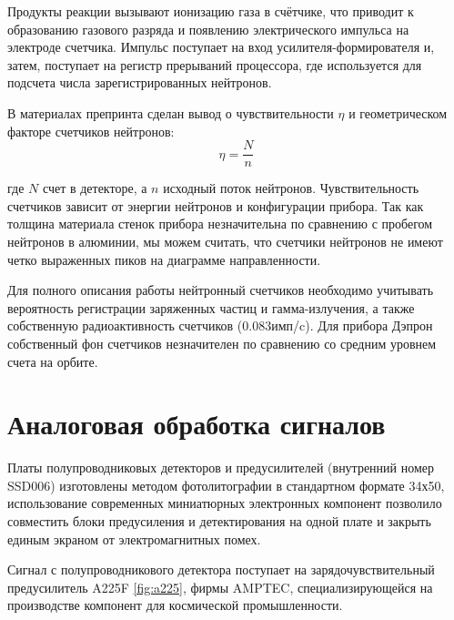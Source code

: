 Продукты реакции вызывают ионизацию газа в счётчике, что приводит к образованию газового разряда и появлению электрического импульса на электроде счетчика. Импульс поступает на вход усилителя-формирователя и, затем, поступает на регистр прерываний процессора, где используется для подсчета числа зарегистрированных нейтронов.
\cite{Shavrin2002}

В материалах препринта \cite{Shavrin1990} сделан вывод о чувствительности $ \eta $ и геометрическом факторе счетчиков нейтронов: 
\begin{equation}\label{eq:sens}
 \eta = \frac{N}{n} 
\end{equation}

где $ N $ счет в детекторе, а $ n $ исходный поток нейтронов. Чувствительность счетчиков зависит от энергии нейтронов и конфигурации прибора. Так как толщина материала стенок прибора незначительна по сравнению с пробегом нейтронов в алюминии, мы можем считать, что счетчики нейтронов не имеют четко выраженных пиков на диаграмме направленности.

Для полного описания работы нейтронный счетчиков необходимо учитывать вероятность регистрации заряженных частиц и гамма-излучения, а также собственную радиоактивность счетчиков (0.083имп/c). Для прибора Дэпрон собственный фон счетчиков незначителен по сравнению со средним уровнем счета на орбите. 

\section{Аналоговая обработка сигналов}

Платы полупроводниковых детекторов и предусилителей (внутренний номер SSD006) изготовлены методом фотолитографии в стандартном формате 34х50, использование современных миниатюрных электронных компонент позволило совместить блоки предусиления и детектирования на одной плате и закрыть единым экраном от электромагнитных помех.

Сигнал с полупроводникового детектора поступает на зарядочувствительный предусилитель A225F \ref{fig:a225}, фирмы AMPTEC, специализирующейся на производстве компонент для космической промышленности. 


